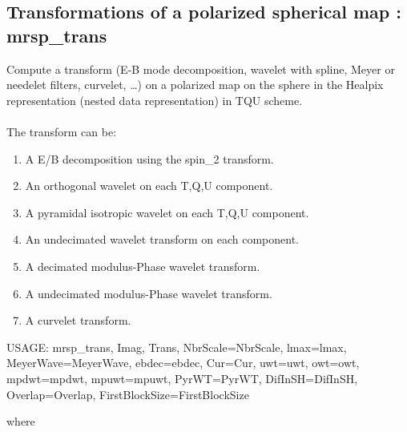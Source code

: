 \subsection{Transformations of a polarized spherical map : mrsp\_trans}
Compute a transform (E-B mode decomposition, wavelet with spline, Meyer or needelet filters, curvelet, \ldots) 
on a polarized map on the sphere in the Healpix representation (nested data representation) in TQU scheme.\\ \\
The transform can be:
\begin{enumerate}
\item A E/B decomposition using the spin\_2 transform.
\item An orthogonal wavelet on each T,Q,U component.
\item A pyramidal isotropic wavelet on each T,Q,U component.
\item An undecimated wavelet transform on each component.
\item A decimated modulus-Phase wavelet transform.
\item A undecimated modulus-Phase wavelet transform.
\item A curvelet transform.
\end{enumerate}
{\bf
\begin{center}
     USAGE: mrsp\_trans, Imag, Trans, NbrScale=NbrScale, lmax=lmax, MeyerWave=MeyerWave, ebdec=ebdec, Cur=Cur, uwt=uwt, owt=owt, mpdwt=mpdwt, mpuwt=mpuwt, PyrWT=PyrWT, 
     DifInSH=DifInSH, Overlap=Overlap, FirstBlockSize=FirstBlockSize
\end{center}}
where
